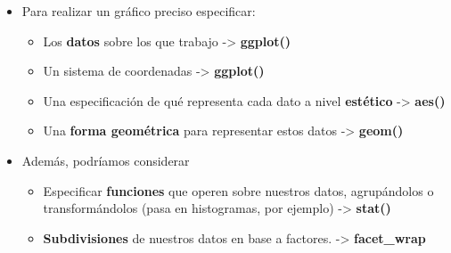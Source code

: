 \documentclass[ignorenonframetext,]{beamer}
\providecommand{\tightlist}{%
  \setlength{\itemsep}{0pt}\setlength{\parskip}{0pt}}
\begin{document}
\begin{frame}{}
\protect\hypertarget{section-9}{}


\begin{itemize}
\tightlist
\item
  Para realizar un gráfico preciso especificar:

  \begin{itemize}
  \tightlist
  \item
    Los \textbf{datos} sobre los que trabajo -\textgreater{}
    \textbf{ggplot()}
  \item
    Un sistema de coordenadas -\textgreater{} \textbf{ggplot()}
  \item
    Una especificación de qué representa cada dato a nivel
    \textbf{estético} -\textgreater{} \textbf{aes()}
  \item
    Una \textbf{forma geométrica} para representar estos datos
    -\textgreater{} \textbf{geom()}
  \end{itemize}
\item
  Además, podríamos considerar

  \begin{itemize}
  \tightlist
  \item
    Especificar \textbf{funciones} que operen sobre nuestros datos,
    agrupándolos o transformándolos (pasa en histogramas, por ejemplo)
    -\textgreater{} \textbf{stat()}
  \item
    \textbf{Subdivisiones} de nuestros datos en base a factores.
    -\textgreater{} \textbf{facet\_wrap}
  \end{itemize}
\end{itemize}

\end{frame}
\end{document}
